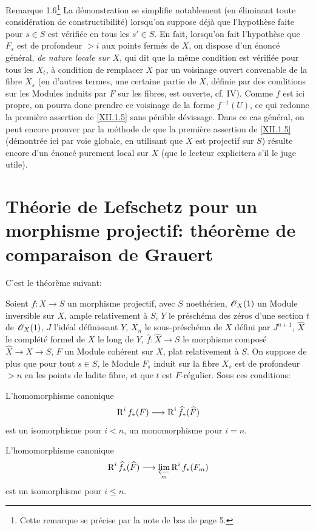 \label{XII.1.6}
\begin{enonce*}[remark]{Remarque 1.6\footnote{Cette remarque se pr\'ecise par la note de bas de page 5.}}  La d\'emonstration se simplifie notablement (en \'eliminant toute consid\'eration de constructibilit\'e) lorsqu'on suppose d\'ej\`a que l'hypoth\`ese faite pour $s\in S$ est v\'erifi\'ee en tous les $s'\in S$. En fait, lorsqu'on fait l'hypoth\`ese que $F_s$ est de profondeur $>i$ aux points ferm\'es de $X$, on dispose d'un \'enonc\'e g\'en\'eral, \emph{de nature locale sur} $X$, qui dit que la m\^eme condition est v\'erifi\'ee pour tous les $X_t$, \`a condition de remplacer $X$ par un voisinage ouvert convenable de la fibre $X_s$ (en d'autres termes, une certaine partie de $X$, d\'efinie par des conditions sur les Modules induits par $F$ sur les fibres, est ouverte, cf. \EGA IV). Comme $f$ est ici propre, on pourra donc prendre ce voisinage de la forme $f^{-1}(U)$, ce qui redonne la premi\`ere assertion de \ref{XII.1.5} sans p\'enible d\'evissage. Dans ce cas g\'en\'eral, on peut encore prouver par la m\'ethode de \loccit que la premi\`ere assertion de \ref{XII.1.5} (d\'emontr\'ee ici par voie globale, en utilisant que $X$ est projectif sur $S$) r\'esulte encore d'un \'enonc\'e purement local sur $X$ (que le lecteur explicitera s'il le juge utile).
\end{enonce*}

\section[Th\'eorie de Lefschetz pour un morphisme projectif: comparaison]
{Th\'eorie de Lefschetz pour un morphisme projectif: th\'eor\`eme de comparaison de Grauert} \label{XII.2}

\setcounter{equation}{13}
C'est le th\'eor\`eme suivant:

\begin{theoreme} \label{XII.2.1}
Soient $f:X\to S$ un morphisme projectif, avec $S$ noeth\'erien, $\mathscr{O}_X(1)$ un Module inversible sur $X$, ample relativement \`a $S$, $Y$ le pr\'esch\'ema des z\'eros d'une section $t$ de $\mathscr{O}_X(1)$, $J$ l'id\'eal d\'efinissant $Y$, $X_n$ le sous-pr\'esch\'ema de $X$ d\'efini par $J^{n+1}$, $\widehat{X}$ le compl\'et\'e formel de $X$ le long de $Y$, $\widehat{f}:\widehat{X}\to S$ le morphisme compos\'e $\widehat{X}\to X\to S$, $F$ un Module coh\'erent sur $X$, plat relativement \`a $S$. On suppose de plus que pour tout $s\in S$, le Module $F_s$ induit sur la fibre $X_s$ est de profondeur $>n$ en les points de ladite fibre, et que $t$ est $F$-r\'egulier. Sous ces conditions:
\begin{enumeratei}
\item
L'homomorphisme canonique
\[
\R^if_\ast(F) \to \R^i\widehat{f}_\ast(\widehat{F})
\]
est un isomorphisme pour $i<n$, un monomorphisme pour $i=n$.
\item
L'homomorphisme canonique
\[
\R^i\widehat{f}_\ast(\widehat{F}) \to \varprojlim_m \R^if_\ast(F_m)
\]
est un isomorphisme pour $i\leq n$.
\end{enumeratei}
\end{theoreme}

